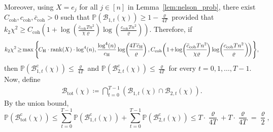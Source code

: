 \documentclass[11pt]{article}
\theoremstyle{definition}
\theoremstyle{plain}
\providecommand{\lemmaref}[1]{Lemma~\ref{#1}}
\begin{document}
Moreover, using $X=e_j$ for all $j\in [n]$ in \lemmaref{lem:nelson_prob}, there exist $C_{\mathrm{coh}}, c_{\mathrm{coh}}, \bar{c}_{\mathrm{coh}} > 0$ such that $\mathbb{P}\left(\mathcal{B}_{1,t}(\chi)\right) \geq 1-\frac{\varrho}{4T}$ provided that $k_2\chi^2 \ge C_{\mathrm{coh}} \left(1+\log\left(\frac{\bar{c}_{\mathrm{coh}} T n^2}{\chi\varrho}\right)\log\left(\frac{c_{\mathrm{coh}} T n^2}{\varrho}\right)\right).$ Therefore, if
\begin{equation}
    k_2\chi^2 \hspace{-0.15em}\ge\hspace{-0.15em} \max\Bigg\{\hspace{-0.15em}
        C_{\mathrm{H}} \cdot \mathrm{rank}(X)\cdot \log^4(n),\frac{\log^4(n)}{c_{\mathrm{H}}}\log\hspace{-0.15em}\left(\hspace{-0.15em}\frac{4T\bar{c}_{\mathrm{H}}}{\varrho}\hspace{-0.15em}\right), C_{\mathrm{coh}}\hspace{-0.15em}\left(1\hspace{-0.15em}+\hspace{-0.15em}\log\hspace{-0.15em}\left(\hspace{-0.15em}\frac{\bar{c}_{\mathrm{coh}} T n^2}{\chi\varrho}\hspace{-0.15em}\right)\log\hspace{-0.15em}\left(\hspace{-0.15em}\frac{c_{\mathrm{coh}} T n^2}{\varrho}\right)\hspace{-0.15em}\right)\hspace{-0.15em}\Bigg\},
\end{equation}
then $\mathbb{P}\left(\mathcal{B}_{1,t}^{\mathrm{c}}(\chi)
\right)\le \frac{\varrho}{4T}$ and $\mathbb{P}\left(\mathcal{B}_{2,t}^{\mathrm{c}}(\chi)\right)\le \frac{\varrho}{4T}$ for every $t=0,1,\ldots, T-1$. Now, define
\begin{align}
    \mathcal{B}_{\mathrm{tot}}(\chi) \coloneq \bigcap_{t=0}^{T-1}\left(\mathcal{B}_{1,t}(\chi)\cap \mathcal{B}_{2,t}(\chi)\right).    
\end{align}
By the union bound,
\begin{equation}
    \mathbb P\left(\mathcal{B}_{\mathrm{tot}}^{\mathrm{c}}(\chi)\right) \leq \sum_{t=0}^{T-1}\mathbb{P}\left(\mathcal{B}_{1,t}^{\mathrm{c}}(\chi)\right) + \sum_{t=0}^{T-1}\mathbb{P}\left(\mathcal{B}_{2,t}^{\mathrm{c}}(\chi)\right) \leq T\cdot \frac{\varrho}{4T} + T\cdot \frac{\varrho}{4T}
     = \frac{\varrho}{2},
\end{equation}
\end{document}
